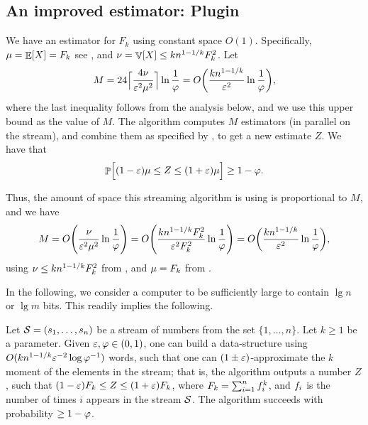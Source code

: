 \subsection{An improved estimator: Plugin}

We have an estimator for $F_k$ using constant space
$O(1)$. Specifically, $\mu = \mathop{\mathbb{E}}\!\left[ {X} \right] = F_k$ see , and
$\nu = \mathop{\mathbb{V}}\!\left[ {X} \right] \leq k n^{1-1/k} F_k^2$. Let
\begin{equation*}
    M = 24 \Bigl\lceil{ \frac{4 \nu\bigr.}{\eps^2\mu^2\bigr.}  }
    \Bigr\rceil \ln \frac{1}{\BadProb}
    =
    O\pth{\frac{ k n^{1-1/k} }{\eps^2}  
       \ln \frac{1}{\BadProb}  },
\end{equation*}
where the last inequality follows from the analysis below, and we use
this upper bound as the value of $M$. The algorithm computes $M$
estimators (in parallel on the stream), and combine them as specified by
, to get a new estimate $Z$. We have that
\begin{equation*}
    \Prob{ (1-\eps)\mu \leq Z \leq (1+\eps)\mu \Bigr.} \geq 1 -
    \BadProb.
\end{equation*}

Thus, the amount of space this streaming algorithm is using is
proportional to $M$, and we have
\begin{equation*}
    M
    =
    O\pth{\frac{ \nu\bigr.}{\eps^2\mu^2\bigr.}  
       \ln \frac{1}{\BadProb}  }    
    =%
    O\pth{\frac{ k n^{1-1/k} \Frq_k^2 }{\eps^2\Frq_k^2\bigr.}  
       \ln \frac{1}{\BadProb}  }    
    =%
    O\pth{\frac{ k n^{1-1/k} }{\eps^2}  
       \ln \frac{1}{\BadProb}  },
\end{equation*}
using $\nu \leq k n^{1-1/k} F_k^2$ from , and
$\mu=F_k$ from .




In the following, we consider a computer  to be
sufficiently large to contain $\lg n$ or $\lg m$ bits. This readily
implies the following.
\begin{theorem}
    Let $\mathcal{S}=({s}_1, \ldots, {s}_n)$ be a stream of numbers from
    the set $\{1,\ldots, n\}$. Let $k \geq 1$ be a parameter. Given
    ${\varepsilon}, \varphi \in (0,1)$, one can build a data-structure using
    $O( kn^{1-1/k}{\varepsilon}^{-2} \log \varphi^{-1})$ words, such that one
    can $(1\pm {\varepsilon})$-approximate the $k$\th moment of the elements in
    the stream; that is, the algorithm outputs a number $Z$, such that
    $(1-{\varepsilon})F_k \leq Z \leq (1+{\varepsilon})F_k$, where
    $F_k = \sum_{i=1}^n f_i^k$, and $f_i$ is the number of
    times $i$ appears in the stream $\mathcal{S}$. The algorithm succeeds
    with probability $\geq 1- \varphi$.
\end{theorem}

